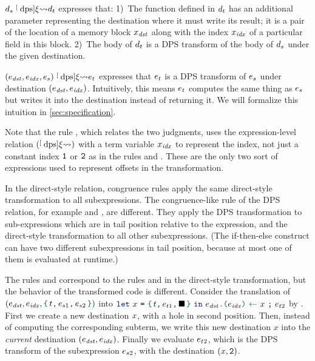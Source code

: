 $\datalangDef_s \tmcDps{\datalangRenaming} \datalangDef_t$ expresses that:
1)~The function defined in $\datalangDef_t$ has an additional parameter representing the destination where it must write its result; it is a pair of the location of a memory block $\datalangVar_\mathit{dst}$ along with the index $\datalangVar_\mathit{idx}$ of a particular field in this block.
2)~The body of $\datalangDef_t$ is a DPS transform of the body of $\datalangDef_s$ under the given destination.

$(\datalangExpr_\mathit{dst}, \datalangExpr_\mathit{idx}, \datalangExpr_s) \tmcDps{\datalangRenaming} \datalangExpr_t$ expresses that $\datalangExpr_t$ is a DPS transform of $\datalangExpr_s$ under destination $(\datalangExpr_\mathit{dst}, \datalangExpr_\mathit{idx})$.
Intuitively, this means $\datalangExpr_t$ computes the same thing as $\datalangExpr_s$ but writes it into the destination instead of returning it.
We will formalize this intuition in \cref{sec:specification}.

Note that the rule , which relates the two judgments, uses the expression-level relation $(\mathrel{\stackrel[\scriptscriptstyle\textrm{dps}]{ \xi }{ \rightsquigarrow }})$ with a term variable $\datalangVar_\mathit{idx}$ to represent the index, not just a constant index $\texttt{1}$ or $\texttt{2}$ as in the rules  and . These are the only two sort of expressions used to represent offsets in the transformation.

In the direct-style relation, congruence rules apply the same direct-style transformation to all subexpressions. The congruence-like rule of the DPS relation, for example  and , are different. They apply the DPS transformation to sub-expressions which are in tail position relative to the expression, and the direct-style transformation to all other subexpressions. (The if-then-else construct can have two different subexpressions in tail position, because at most one of them is evaluated at runtime.)

The rules  and 
correspond to the rules  and  in the direct-style transformation, but the behavior of the transformed code is different. Consider the translation of $
\left(
  \datalangExpr_\mathit{dst},
  \datalangExpr_\mathit{idx},
  \datalangBlock{\datalangTag}{\datalangExpr_{s1}}{\datalangExpr_{s2}}
\right)
$ into $
\datalangLet{\datalangVar}{\datalangBlock{\datalangTag}{\datalangExpr_{t1}}{\datalangHole}}{
  \datalangSeq{\datalangStore{\datalangExpr_\mathit{dst}}{\datalangExpr_\mathit{idx}}{\datalangVar}}{\datalangExpr_{t2}}}
$ by . First we create a new destination $\datalangVar$, with a hole in second position. Then, instead of computing the corresponding subterm, we write this new destination $x$ into the \emph{current} destination $({\datalangExpr_\mathit{dst}}, {\datalangExpr_\mathit{idx}})$. Finally we evaluate $\datalangExpr_{t2}$, which is the DPS transform of the subexpression $\datalangExpr_{s2}$, with the destination $(\datalangVar, \datalangTwo)$.

